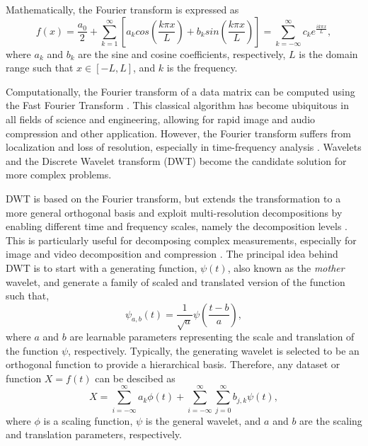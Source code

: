 \documentclass[a4paper,fleqn,12pt]{article}
\begin{document}
Mathematically, the Fourier transform is expressed as
\begin{equation}
    f(x) = \frac{a_0}{2} + 
    \sum_{k=1}^\infty [a_k cos(\frac{k\pi x}{L}) + b_k sin(\frac{k\pi x}{L})] 
    = \sum_{k=-\infty}^{\infty} c_k e^{\frac{ik\pi x}{L}} ,
\end{equation}
where $a_k$ and $b_k$ are the sine and cosine coefficients, respectively, $L$ is the domain range such that $x\in[-L,L]$, and $k$ is the frequency.

Computationally, the Fourier transform of a data matrix can be computed using the Fast Fourier Transform \cite{cooley1969fast, nussbaumer1982fast}. This classical algorithm has become ubiquitous in all fields of science and engineering, allowing for rapid image and audio compression and other application. However, the Fourier transform suffers from localization and loss of resolution, especially in time-frequency analysis \cite{susrutha2019analysis}. Wavelets and the Discrete Wavelet transform (DWT) become the candidate solution for more complex problems.

DWT is based on the Fourier transform, but extends the transformation to a more general orthogonal basis and exploit multi-resolution decompositions by enabling different time and frequency scales, namely the decomposition levels \cite{heil1989continuous, edwards1991discrete}. This is particularly useful for decomposing complex measurements, especially for image and video decomposition and compression \cite{othman2020applications}. The principal idea behind DWT is to start with a generating function, $\psi(t)$, also known as the \emph{mother} wavelet, and generate a family of scaled and translated version of the function such that,
\begin{equation}
    \psi_{a,b}(t) = \frac{1}{\sqrt a}\psi(\frac{t-b}{a}),
\end{equation}
where $a$ and $b$ are learnable parameters representing the scale and translation of the function $\psi$, respectively. Typically, the generating wavelet is selected to be an orthogonal function to provide a hierarchical basis. Therefore, any dataset or function $X=f(t)$ can be descibed as 
\begin{equation}
    X = \sum_{i=-\infty}^{\infty}a_k\phi(t) + \sum_{i=-\infty}^{\infty}\sum_{j=0}^{\infty}b_{j,k}\psi(t) ,
\end{equation}
where $\phi$ is a scaling function, $\psi$ is the general wavelet, and $a$ and $b$ are the scaling and translation parameters, respectively.
\end{document}
